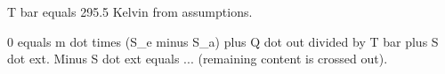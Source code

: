 T bar equals 295.5 Kelvin from assumptions.  

0 equals m dot times (S_e minus S_a) plus Q dot out divided by T bar plus S dot ext.  
Minus S dot ext equals ... (remaining content is crossed out).